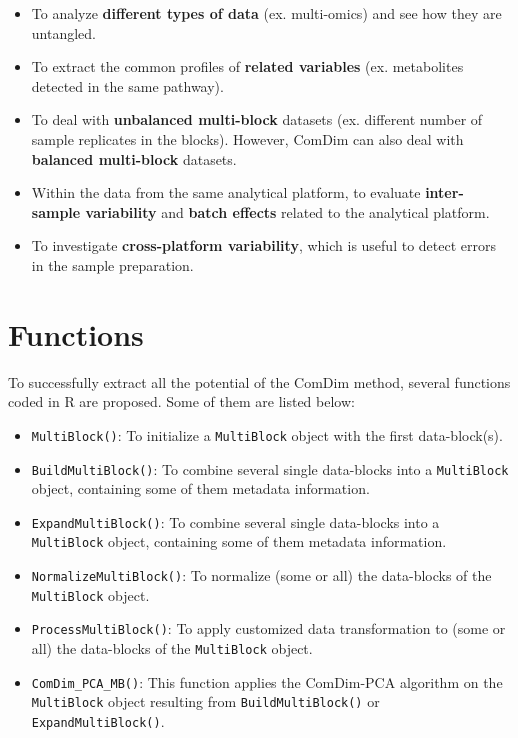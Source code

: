 \documentclass[
]{book}
\providecommand{\tightlist}{%
  \setlength{\itemsep}{0pt}\setlength{\parskip}{0pt}}
\begin{document}
\begin{itemize}
\tightlist
\item
  To analyze \textbf{different types of data} (ex. multi-omics) and see how they are
  untangled.
\item
  To extract the common profiles of \textbf{related variables} (ex. metabolites
  detected in the same pathway).
\item
  To deal with \textbf{unbalanced multi-block} datasets (ex. different number of
  sample replicates in the blocks). However, ComDim can also deal with
  \textbf{balanced multi-block} datasets.
\item
  Within the data from the same analytical platform, to evaluate
  \textbf{inter-sample variability} and \textbf{batch effects} related to the analytical
  platform.
\item
  To investigate \textbf{cross-platform variability}, which is useful to detect
  errors in the sample preparation.
\end{itemize}

\hypertarget{functions}{%
\section{Functions}\label{functions}}

To successfully extract all the potential of the ComDim method, several
functions coded in R are proposed. Some of them are listed below:

\begin{itemize}
\tightlist
\item
  \texttt{MultiBlock()}: To initialize a \texttt{MultiBlock} object with the first data-block(s).
\item
  \texttt{BuildMultiBlock()}: To combine several single data-blocks into a \texttt{MultiBlock}
  object, containing some of them metadata information.
\item
  \texttt{ExpandMultiBlock()}: To combine several single data-blocks into a
  \texttt{MultiBlock} object, containing some of them metadata information.
\item
  \texttt{NormalizeMultiBlock()}: To normalize (some or all) the data-blocks of the
  \texttt{MultiBlock} object.
\item
  \texttt{ProcessMultiBlock()}: To apply customized data transformation to (some or
  all) the data-blocks of the \texttt{MultiBlock} object.
\item
  \texttt{ComDim\_PCA\_MB()}: This function applies the ComDim-PCA algorithm on the
  \texttt{MultiBlock} object resulting from \texttt{BuildMultiBlock()} or \texttt{ExpandMultiBlock()}.
\end{itemize}
\end{document}

